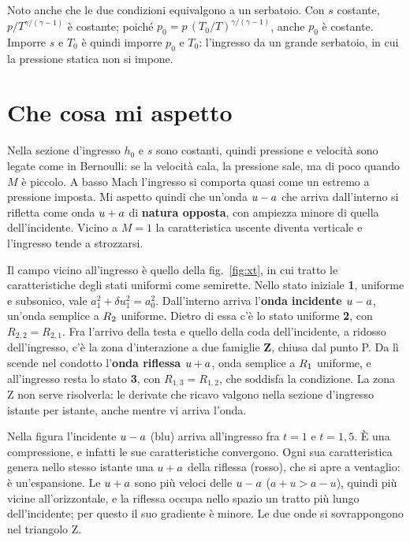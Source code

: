 Noto anche che le due condizioni equivalgono a un serbatoio. Con $s$ costante, $p/T^{\gamma/(\gamma-1)}$ è
costante; poiché $p_0=p\,(T_0/T)^{\gamma/(\gamma-1)}$, anche $p_0$ è costante. Imporre $s$ e $T_0$ è quindi
imporre $p_0$ e $T_0$: l'ingresso da un grande serbatoio, in cui la pressione statica non si impone.

\section*{Che cosa mi aspetto}
Nella sezione d'ingresso $h_0$ e $s$ sono costanti, quindi pressione e velocità sono legate come in Bernoulli: se la
velocità cala, la pressione sale, ma di poco quando $M$ è piccolo. A basso Mach l'ingresso si comporta quasi come
un estremo a pressione imposta. Mi aspetto quindi che un'onda $u-a$ che arriva dall'interno si rifletta come onda
$u+a$ di \textbf{natura opposta}, con ampiezza minore di quella dell'incidente. Vicino a $M=1$ la caratteristica
uscente diventa verticale e l'ingresso tende a strozzarsi.

Il campo vicino all'ingresso è quello della fig.~\ref{fig:xt}, in cui tratto le caratteristiche degli stati uniformi
come semirette. Nello stato iniziale \textbf{1}, uniforme e subsonico, vale $a_1^2+\delta u_1^2=a_0^2$. Dall'interno
arriva l'\textbf{onda incidente $u-a$}, un'onda semplice a $R_2$ uniforme. Dietro di essa c'è lo stato uniforme
\textbf{2}, con $R_{2,2}=R_{2,1}$. Fra l'arrivo della testa e quello della coda dell'incidente, a ridosso
dell'ingresso, c'è la zona d'interazione a due famiglie \textbf{Z}, chiusa dal punto P. Da lì scende nel condotto
l'\textbf{onda riflessa $u+a$}, onda semplice a $R_1$ uniforme, e all'ingresso resta lo stato \textbf{3}, con
$R_{1,3}=R_{1,2}$, che soddisfa la condizione. La zona Z non serve risolverla: le derivate che ricavo valgono nella
sezione d'ingresso istante per istante, anche mentre vi arriva l'onda.


Nella figura l'incidente $u-a$ (blu) arriva all'ingresso fra $t=1$ e $t=1{,}5$. È una compressione, e infatti le
sue caratteristiche convergono. Ogni sua caratteristica genera nello stesso istante una $u+a$ della riflessa
(rosso), che si apre a ventaglio: è un'espansione. Le $u+a$ sono più veloci delle $u-a$ ($a+u>a-u$), quindi più
vicine all'orizzontale, e la riflessa occupa nello spazio un tratto più lungo dell'incidente; per questo il suo
gradiente è minore. Le due onde si sovrappongono nel triangolo Z.

